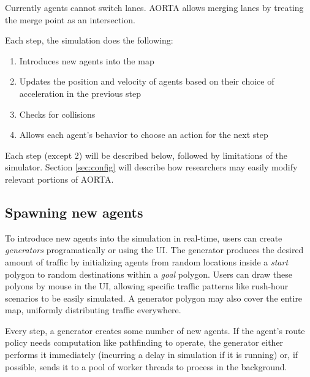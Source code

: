 \documentclass[letterpaper, 10 pt, conference]{ieeeconf}  %
\begin{document}
Currently agents cannot switch lanes. AORTA allows merging lanes by treating
the merge point as an intersection. 

Each step, the simulation does the following:

\begin{enumerate}
  \item Introduces new agents into the map
  \item Updates the position and velocity of agents based on their choice of
        acceleration in the previous step
  \item Checks for collisions
  \item Allows each agent's behavior to choose an action for the next step
\end{enumerate}

Each step (except 2) will be described below, followed by limitations of the
simulator. Section \ref{sec:config} will describe how researchers may easily
modify relevant portions of AORTA.

\subsection{Spawning new agents}

To introduce new agents into the simulation in real-time, users can create
\emph{generators} programatically or using the UI. The generator produces the
desired amount of traffic by initializing agents from random locations inside a
\textit{start} polygon to random destinations within a \textit{goal} polygon.
Users can draw these polyons by mouse in the UI, allowing specific traffic
patterns like rush-hour scenarios to be easily simulated. A generator polygon
may also cover the entire map, uniformly distributing traffic everywhere.

Every step, a generator creates some number of new agents. If the agent's route
policy needs computation like pathfinding to operate, the generator either
performs it immediately (incurring a delay in simulation if it is running) or,
if possible, sends it to a pool of worker threads to process in the background.
\end{document}

